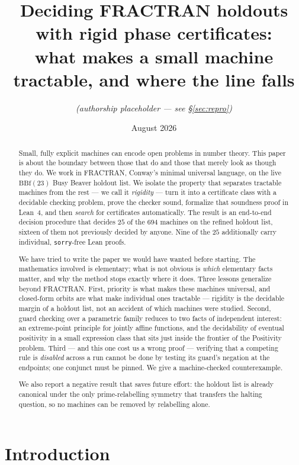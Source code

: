 \documentclass[11pt,a4paper]{article}
\title{Deciding FRACTRAN holdouts with rigid phase certificates:\\
\large what makes a small machine tractable, and where the line falls}
\author{\textit{(authorship placeholder --- see \S\ref{sec:repro})}}
\date{August 2026}
\theoremstyle{plain}
\theoremstyle{definition}
\begin{document}
\maketitle

\begin{abstract}
Small, fully explicit machines can encode open problems in number theory.
This paper is about the boundary between those that do and those that
merely look as though they do. We work in FRACTRAN, Conway's minimal
universal language, on the live $\mathrm{BBf}(23)$ Busy Beaver holdout
list. We isolate the property that separates tractable machines from the
rest --- we call it \emph{rigidity} --- turn it into a certificate class
with a decidable checking problem, prove the checker sound, formalize
that soundness proof in Lean~4, and then \emph{search} for certificates
automatically. The result is an end-to-end decision procedure that decides
$25$ of the $694$ machines on the refined holdout list, sixteen of them
not previously decided by anyone. Nine of the $25$ additionally carry
individual, \texttt{sorry}-free Lean proofs.

We have tried to write the paper we would have wanted before starting.
The mathematics involved is elementary; what is not obvious is
\emph{which} elementary facts matter, and why the method stops exactly
where it does. Three lessons generalize beyond FRACTRAN. First, priority
is what makes these machines universal, and closed-form orbits are what
make individual ones tractable --- rigidity is the decidable margin of a
holdout list, not an accident of which machines were studied. Second,
guard checking over a parametric family reduces to two facts of
independent interest: an extreme-point principle for jointly affine
functions, and the decidability of eventual positivity in a small
expression class that sits just inside the frontier of the Positivity
problem. Third --- and this one cost us a wrong proof --- verifying that
a competing rule is \emph{disabled} across a run cannot be done by
testing its guard's negation at the endpoints; one conjunct must be
pinned. We give a machine-checked counterexample.

We also report a negative result that saves future effort: the holdout
list is already canonical under the only prime-relabelling symmetry that
transfers the halting question, so no machines can be removed by
relabelling alone.
\end{abstract}

\tableofcontents

\section{Introduction}
\end{document}
